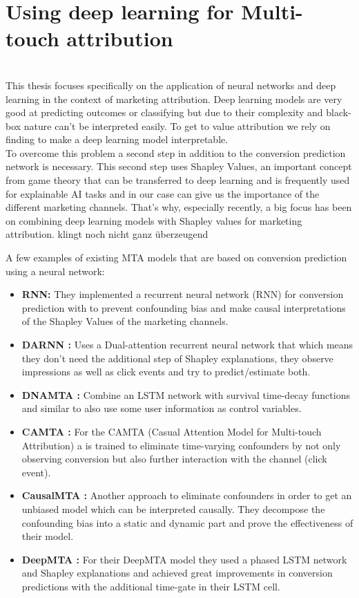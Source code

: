 \section{Using deep learning for Multi-touch attribution}\\
This thesis focuses specifically on the application of neural networks and deep learning in the context of marketing attribution. 
Deep learning models are very good at predicting outcomes or classifying but due to their complexity and black-box nature can't be interpreted easily. To get to value attribution we rely on finding to make a deep learning model interpretable.\\
To overcome this problem a second step in addition to the conversion prediction network is necessary. This second step uses Shapley Values, an important concept from game theory that can be transferred to deep learning and is frequently used for explainable AI tasks and in our case can give us the importance of the different marketing channels. That's why, especially recently, a big focus has been on combining deep learning models with Shapley values for marketing attribution. \color{red} klingt noch nicht ganz überzeugend\color{black}

A few examples of existing MTA models that are based on conversion prediction using a neural network:
\begin{itemize}
    \item \textbf{RNN\cite{du-2019}:} They implemented a recurrent neural network (RNN) for conversion prediction with  to prevent confounding bias and make causal interpretations of the Shapley Values of the marketing channels.
    \item \textbf{DARNN \cite{ren-2018}:} Uses a Dual-attention recurrent neural network that  which means they don't need the additional step of Shapley explanations, they observe impressions as well as click events and try to predict/estimate both.
    \item \textbf{DNAMTA \cite{li-2018}:} Combine an LSTM network with survival time-decay functions and similar to \cite{du-2019} also use some user information as control variables.
    \item \textbf{CAMTA \cite{kumar-2020}:} For the CAMTA (Casual Attention Model for Multi-touch Attribution) a   is trained to eliminate time-varying confounders by not only observing conversion but also further interaction with the channel (click event).
    \item \textbf{CausalMTA \cite{yao-2022}:} Another approach to eliminate confounders in order to get an unbiased model which can be interpreted causally. They decompose the confounding bias into a static and dynamic part and prove the effectiveness of their model.
    \item \textbf{DeepMTA \cite{yang-2020}:} For their DeepMTA model they used a phased LSTM network and Shapley explanations and achieved great improvements in conversion predictions with the additional time-gate in their LSTM cell.
\end{itemize}

